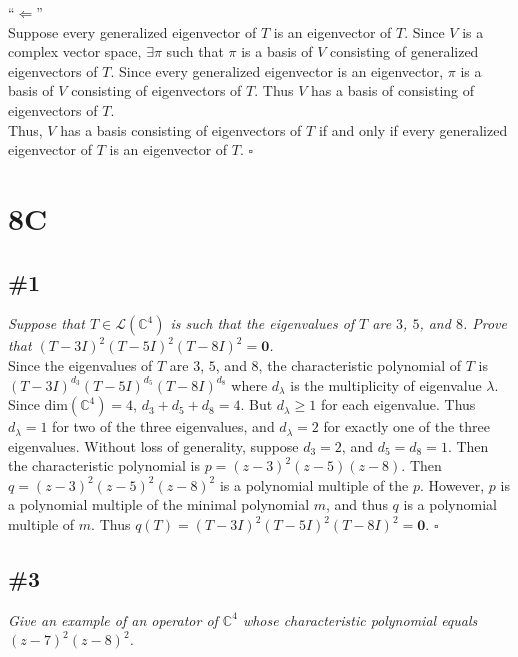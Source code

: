 \documentclass[12pt]{article}
\begin{document}
\noindent ``$\Longleftarrow$'' \\
Suppose every generalized eigenvector of $T$ is an eigenvector of $T$.  Since $V$ is a complex vector space, $\exists \pi$ such that $\pi$ is a basis of $V$ consisting of generalized eigenvectors of $T$.  Since every generalized eigenvector is an eigenvector, $\pi$ is a basis of $V$ consisting of eigenvectors of $T$.  Thus $V$ has a basis of consisting of eigenvectors of $T$.\\

\noindent Thus, $V$ has a basis consisting of eigenvectors of $T$ if and only if every generalized eigenvector of $T$ is an eigenvector of $T$. \hfill $\square$

\section*{8C}
\subsection*{\#1}
{\it Suppose that $T \in \mathcal{L}(\mathbb{C}^4)$ is such that the eigenvalues of $T$ are $3$, $5$, and $8$.  Prove that $(T - 3I)^2(T - 5I)^2(T - 8I)^2 = \mathbf{0}$.} \\

\noindent Since the eigenvalues of $T$ are $3$, $5$, and $8$, the characteristic polynomial of $T$ is $(T - 3I)^{d_3}(T - 5I)^{d_5}(T - 8I)^{d_8}$ where $d_\lambda$ is the multiplicity of eigenvalue $\lambda$.  Since $\text{dim}(\mathbb{C}^4) = 4$, $d_3 + d_5 + d_8 = 4$.  But $d_\lambda \geq 1$ for each eigenvalue.  Thus $d_\lambda = 1$ for two of the three eigenvalues, and $d_\lambda = 2$ for exactly one of the three eigenvalues.  Without loss of generality, suppose $d_3 = 2$, and $d_5 = d_8 = 1$.  Then the characteristic polynomial is $p = (z - 3)^2(z - 5)(z - 8)$.  Then $q = (z - 3)^2(z - 5)^2(z - 8)^2$ is a polynomial multiple of the $p$.  However, $p$ is a polynomial multiple of the minimal polynomial $m$, and thus $q$ is a polynomial multiple of $m$.  Thus $q(T) = (T - 3I)^2(T - 5I)^2(T - 8I)^2 = \mathbf{0}$. \hfill $\square$

\subsection*{\#3}
{\it Give an example of an operator of $\mathbb{C}^4$ whose characteristic polynomial equals $(z - 7)^2(z - 8)^2$.} \\
\end{document}
